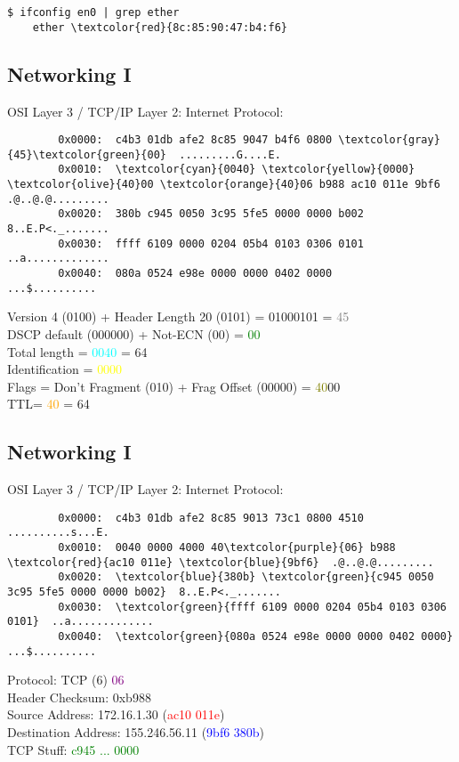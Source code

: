 \documentclass[xga]{xdvislides}
\begin{document}
\begin{Verbatim}
$ ifconfig en0 | grep ether
	ether \textcolor{red}{8c:85:90:47:b4:f6}
\end{Verbatim}

\subsection{Networking I}
OSI Layer 3 / TCP/IP Layer 2: Internet Protocol: \\
\begin{Verbatim}
        0x0000:  c4b3 01db afe2 8c85 9047 b4f6 0800 \textcolor{gray}{45}\textcolor{green}{00}  .........G....E.
        0x0010:  \textcolor{cyan}{0040} \textcolor{yellow}{0000} \textcolor{olive}{40}00 \textcolor{orange}{40}06 b988 ac10 011e 9bf6  .@..@.@.........
        0x0020:  380b c945 0050 3c95 5fe5 0000 0000 b002  8..E.P<._.......
        0x0030:  ffff 6109 0000 0204 05b4 0103 0306 0101  ..a.............
        0x0040:  080a 0524 e98e 0000 0000 0402 0000       ...$..........
\end{Verbatim}
\vspace{.5in}

Version 4 (0100) + Header Length 20 (0101) = 01000101 = \textcolor{gray}{45} \\
DSCP default (000000) + Not-ECN (00) = \textcolor{green}{00} \\
Total length = \textcolor{cyan}{0040} = 64\\
Identification = \textcolor{yellow}{0000} \\
Flags = Don't Fragment (010) + Frag Offset (00000) = \textcolor{olive}{40}00 \\
TTL= \textcolor{orange}{40} = 64 \\


\subsection{Networking I}
OSI Layer 3 / TCP/IP Layer 2: Internet Protocol: \\
\begin{Verbatim}
        0x0000:  c4b3 01db afe2 8c85 9013 73c1 0800 4510  ..........s...E.
        0x0010:  0040 0000 4000 40\textcolor{purple}{06} b988 \textcolor{red}{ac10 011e} \textcolor{blue}{9bf6}  .@..@.@.........
        0x0020:  \textcolor{blue}{380b} \textcolor{green}{c945 0050 3c95 5fe5 0000 0000 b002}  8..E.P<._.......
        0x0030:  \textcolor{green}{ffff 6109 0000 0204 05b4 0103 0306 0101}  ..a.............
        0x0040:  \textcolor{green}{080a 0524 e98e 0000 0000 0402 0000}       ...$..........
\end{Verbatim}
Protocol: TCP (6) \textcolor{purple}{06} \\
Header Checksum: 0xb988 \\
Source Address: 172.16.1.30 (\textcolor{red}{ac10 011e}) \\
Destination Address: 155.246.56.11 (\textcolor{blue}{9bf6 380b}) \\
TCP Stuff: \textcolor{green}{c945 ... 0000}
\end{document}
